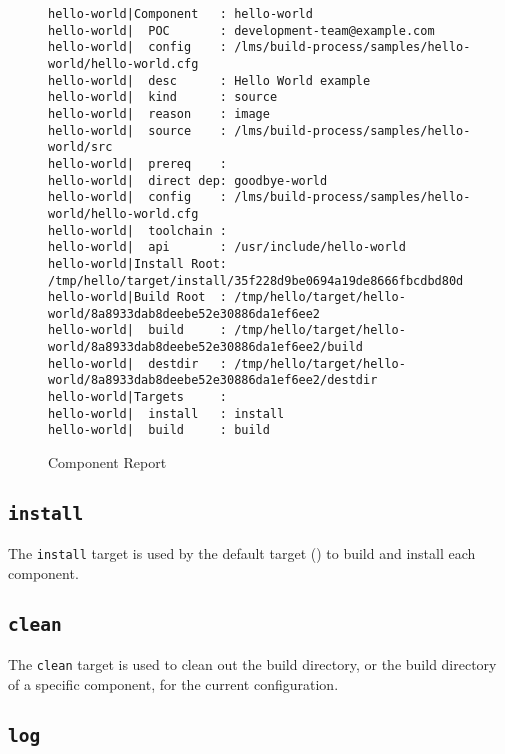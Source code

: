 \begin{landscape}
\begin{figure}
\hrulefill
\begin{small}
\begin{verbatim}
hello-world|Component   : hello-world
hello-world|  POC       : development-team@example.com
hello-world|  config    : /lms/build-process/samples/hello-world/hello-world.cfg
hello-world|  desc      : Hello World example
hello-world|  kind      : source
hello-world|  reason    : image
hello-world|  source    : /lms/build-process/samples/hello-world/src
hello-world|  prereq    :
hello-world|  direct dep: goodbye-world
hello-world|  config    : /lms/build-process/samples/hello-world/hello-world.cfg
hello-world|  toolchain :
hello-world|  api       : /usr/include/hello-world
hello-world|Install Root: /tmp/hello/target/install/35f228d9be0694a19de8666fbcdbd80d
hello-world|Build Root  : /tmp/hello/target/hello-world/8a8933dab8deebe52e30886da1ef6ee2
hello-world|  build     : /tmp/hello/target/hello-world/8a8933dab8deebe52e30886da1ef6ee2/build
hello-world|  destdir   : /tmp/hello/target/hello-world/8a8933dab8deebe52e30886da1ef6ee2/destdir
hello-world|Targets     :
hello-world|  install   : install
hello-world|  build     : build
\end{verbatim}
\end{small}
\hrulefill
\caption{Component Report}\label{usinglmsbw:component-report}
\end{figure}
\end{landscape}

\subsection{\texttt{install}}

The \texttt{install} target is used by the default target
() to build and install each component.

\subsection{\texttt{clean}}

The \texttt{clean} target is used to clean out the build directory, or
the build directory of a specific component, for the current
configuration.

\subsection{\texttt{log}}
\label{using:component-log-target}

